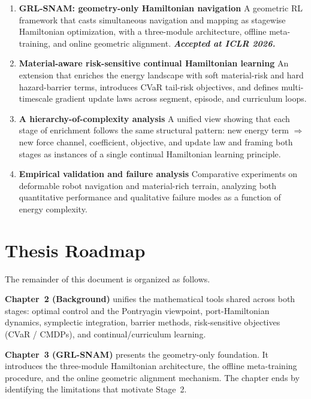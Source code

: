 \begin{enumerate}
  \item \textbf{GRL-SNAM: geometry-only Hamiltonian navigation}
        A geometric RL framework that casts simultaneous navigation and
        mapping as stagewise Hamiltonian optimization, with a three-module
        architecture, offline meta-training, and online geometric alignment.
        \textit{\textbf{Accepted at ICLR 2026.}}

  \item \textbf{Material-aware risk-sensitive continual Hamiltonian learning}
        An extension that enriches the energy landscape with soft material-risk
        and hard hazard-barrier terms, introduces CVaR tail-risk objectives,
        and defines multi-timescale gradient update laws across segment,
        episode, and curriculum loops.

  \item \textbf{A hierarchy-of-complexity analysis}
        A unified view showing that each stage of enrichment follows the
        same structural pattern: new energy term $\Rightarrow$ new force
        channel, coefficient, objective, and update law and framing both
        stages as instances of a single continual Hamiltonian learning
        principle.

  \item \textbf{Empirical validation and failure analysis}
        Comparative experiments on deformable robot navigation and
        material-rich terrain, analyzing both quantitative performance and
        qualitative failure modes as a function of energy complexity.
\end{enumerate}

\section{Thesis Roadmap}
\label{sec:intro:roadmap}
The remainder of this document is organized as follows.

\textbf{Chapter~2 (Background)} unifies the mathematical tools shared
across both stages: optimal control and the Pontryagin viewpoint,
port-Hamiltonian dynamics, symplectic integration, barrier methods,
risk-sensitive objectives (CVaR / CMDPs), and
continual/curriculum learning.

\textbf{Chapter~3 (GRL-SNAM)} presents the geometry-only foundation.
It introduces the three-module Hamiltonian architecture, the offline
meta-training procedure, and the online geometric alignment mechanism.
The chapter ends by identifying the limitations that motivate Stage~2.

